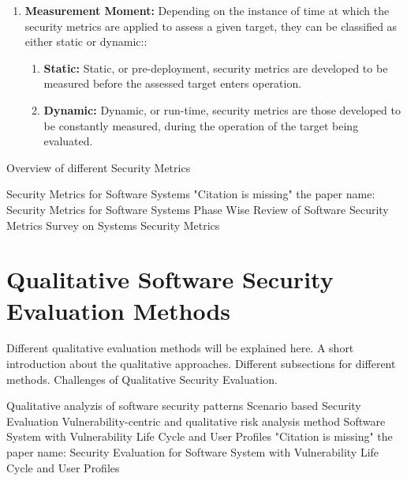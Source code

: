 \documentclass[pdftex,english,oribibl]{llncs}
\begin{document}
\begin{enumerate}
	\item {\textbf{Measurement Moment:} Depending on the instance of time at which the security metrics are applied to assess a given target, they can be classified as either static or dynamic::}
	\begin{enumerate}
	\item {\textbf{Static:} Static, or pre-deployment, security metrics are developed to be measured before the assessed target enters operation.}
	\item {\textbf{Dynamic:} Dynamic, or run-time, security metrics are those developed to be constantly measured, during the operation of the target being evaluated.}
	\end{enumerate}

\end{enumerate}

Overview of different  Security Metrics\newline

	Security Metrics for Software Systems\cite{Wang:2009:SMS:1566445.1566509}\newline
	"Citation is missing" the paper name: Security Metrics for Software Systems\newline
	Phase Wise Review of Software Security Metrics\cite{Ansar:PWRSSM}\newline
	Survey on Systems Security Metrics\cite{Pendleton:2016:SSS:3022634.3005714}\newline
	
\section{Qualitative Software Security Evaluation Methods}
Different qualitative evaluation methods will be explained here.\newline
A short introduction about the qualitative approaches.\newline
Different subsections for different methods.\newline
Challenges of Qualitative Security Evaluation.\newline

	Qualitative analyzis of software security patterns\cite{5564015}\newline
 	Scenario based Security Evaluation\cite{Halkidis:2006:QAS:2639528.2639723}\newline
  	Vulnerability-centric and qualitative risk analysis method\cite{6165757}\newline
  	Software System with Vulnerability Life Cycle and User Profiles\cite{6532147}\newline
  	"Citation is missing" the paper name: Security Evaluation for Software System with Vulnerability Life Cycle and User Profiles\newline
  
\end{document}
